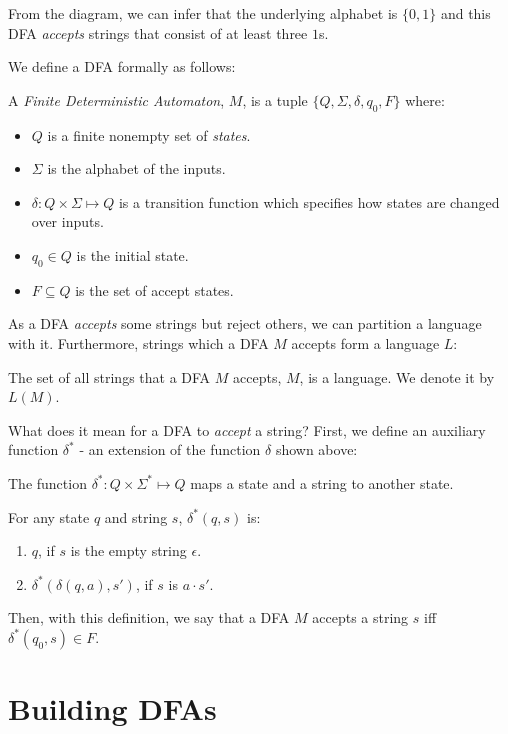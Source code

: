 \documentclass[11pt]{article}
\begin{document}
From the diagram, we can infer that the underlying alphabet is $\{0, 1\}$ and this DFA \emph{accepts} strings
that consist of at least three $1$s.

We define a DFA formally as follows:
\begin{definition}
A \emph{Finite Deterministic Automaton}, $M$, is a tuple $\{Q, \Sigma, \delta, q_0, F\}$ where:
\begin{itemize}
\item $Q$ is a finite nonempty set of \emph{states}.
\item $\Sigma$ is the alphabet of the inputs.
\item $\delta: Q \times \Sigma \mapsto Q$ is a transition function which specifies how states are changed over
inputs.
\item $q_0 \in Q$ is the initial state.
\item $F \subseteq Q$ is the set of accept states.
\end{itemize}
\end{definition}

As a DFA \emph{accepts} some strings but reject others, we can partition a language with it. Furthermore,
strings which a DFA $M$ accepts form a language $L$:
\begin{definition}
The set of all strings that a DFA $M$ accepts, $M$, is a language. We denote it by $L(M)$.
\end{definition}

What does it mean for a DFA to \emph{accept} a string? First, we define an auxiliary function $\delta ^ \ast$ - an
extension of the function $\delta$ shown above:
\begin{definition}
The function $\delta ^ \ast : Q \times \Sigma ^ \ast \mapsto Q$ maps a state and a string to another state.

For any state $q$ and string $s$, $\delta ^ \ast (q, s)$ is:
\begin{enumerate}
\item $q$, if $s$ is the empty string $\epsilon$.
\item $\delta ^ \ast( \delta(q, a), s' )$, if $s$ is $a \cdot s'$.
\end{enumerate}
\end{definition}

Then, with this definition, we say that a DFA $M$ accepts a string $s$ iff $\delta ^ \ast(q_0, s) \in F$.

\section{Building DFAs} \label{sec:3}
\end{document}

